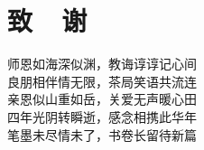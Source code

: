 \section*{致~~谢}


\begin{center}
  师恩如海深似渊，教诲谆谆记心间
  \\良朋相伴情无限，茶局笑语共流连
  \\亲恩似山重如岳，关爱无声暖心田
  \\四年光阴转瞬逝，感念相携此华年
  \\笔墨未尽情未了，书卷长留待新篇
\end{center}
